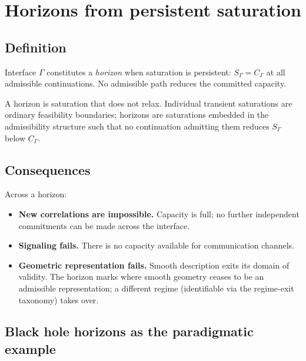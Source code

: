 \documentclass[11pt]{article}
\theoremstyle{definition}
\begin{document}
\clearpage

\section{Horizons from persistent saturation}\label{sec:horizons}

\subsection{Definition}\label{sec:horizon_definition}

\begin{tcolorbox}[apfbox, title={Definition 6.1 (Horizon)}]
Interface $\Gamma$ constitutes a \emph{horizon} when saturation is persistent: $S_\Gamma = C_\Gamma$ at all admissible continuations. No admissible path reduces the committed capacity.
\end{tcolorbox}

A horizon is saturation that does not relax. Individual transient saturations are ordinary feasibility boundaries; horizons are saturations embedded in the admissibility structure such that no continuation admitting them reduces $S_\Gamma$ below $C_\Gamma$.

\subsection{Consequences}\label{sec:horizon_consequences}

Across a horizon:
\begin{itemize}
    \item \textbf{New correlations are impossible.} Capacity is full; no further independent commitments can be made across the interface.
    \item \textbf{Signaling fails.} There is no capacity available for communication channels.
    \item \textbf{Geometric representation fails.} Smooth description exits its domain of validity. The horizon marks where smooth geometry ceases to be an admissible representation; a different regime (identifiable via the regime-exit taxonomy) takes over.
\end{itemize}

\subsection{Black hole horizons as the paradigmatic example}\label{sec:horizons_BH}
\end{document}
